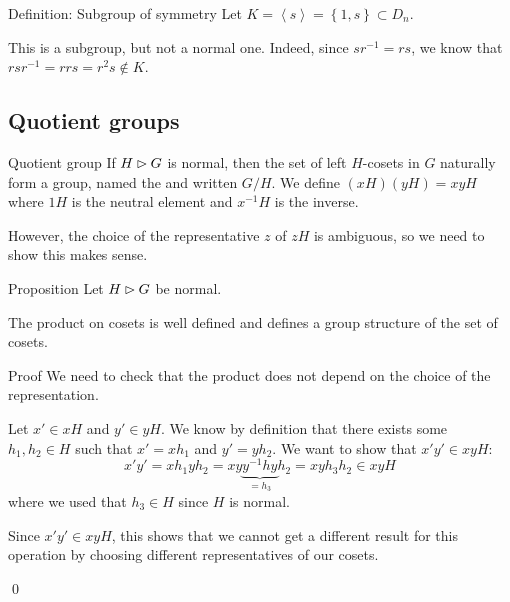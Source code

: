 \documentclass[a4paper]{article}
\begin{document}
\begin{parag}{Definition: Subgroup of symmetry}
    Let $K = \left\langle s \right\rangle = \left\{1, s\right\} \subset D_n$.

    This is a subgroup, but not a normal one. Indeed, since $sr^{-1} = rs$, we know that $r s r ^{-1} = rr s = r^2 s \not \in K$.
\end{parag}

\subsection{Quotient groups}

\begin{parag}{Quotient group}
    If $H \rhd G$ is normal, then the set of left $H$-cosets in $G$ naturally form a group, named the  and written $G / H$. We define $\left(xH\right)\left(yH\right) = xyH$ where $1H$ is the neutral element and $x^{-1}H$ is the inverse.

    However, the choice of the representative $z$ of $zH$ is ambiguous, so we need to show this makes sense.
\end{parag}

\begin{parag}{Proposition}
    Let $H \rhd G$ be normal.

    The product on cosets is well defined and defines a group structure of the set of cosets.

    \begin{subparag}{Proof}
        We need to check that the product does not depend on the choice of the representation.

        Let $x' \in xH$ and $y' \in yH$. We know by definition that there exists some $h_1, h_2 \in H$ such that $x' = xh_1$ and $y' = yh_2$. We want to show that $x' y' \in xy H$: 
        \[x' y' = x h_1 y h_2 = x y \underbrace{y^{-1} h y}_{= h_3} h_2 = xy h_3 h_2 \in xy H\]
        where we used that $h_3 \in H$ since $H$ is normal.

        Since $x' y' \in xy H$, this shows that we cannot get a different result for this operation by choosing different representatives of our cosets.
        
        \qed
    \end{subparag}
\end{parag}
\end{document}
